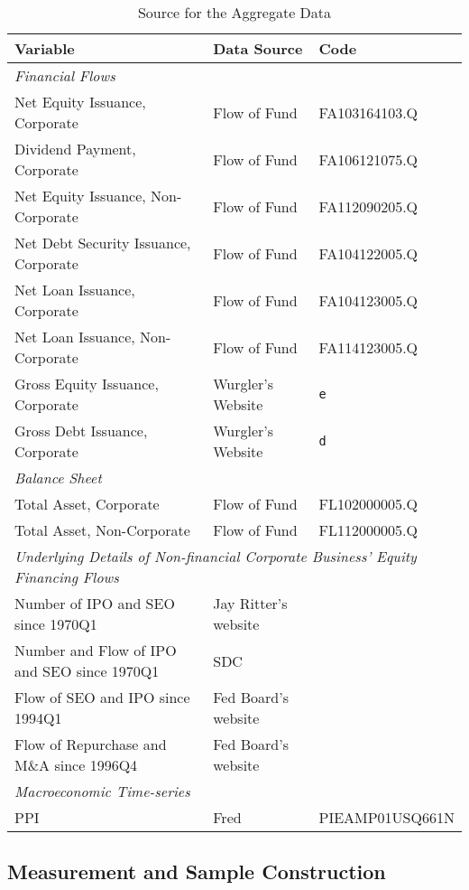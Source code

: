 \documentclass[11pt]{article}
\begin{document}
\begin{table}[htbp]
	\centering
	\caption{Source for the Aggregate Data}
	\begin{tabular}{lll}
		\toprule
		Variable & Data Source & Code \\
		\midrule
		\multicolumn{3}{l}{\textit{Financial Flows}} \\
		Net Equity Issuance, Corporate & Flow of Fund & FA103164103.Q \\
		Dividend Payment, Corporate & Flow of Fund & FA106121075.Q \\
		Net Equity Issuance, Non-Corporate & Flow of Fund & FA112090205.Q \\
		Net Debt Security Issuance, Corporate & Flow of Fund & FA104122005.Q \\
		Net Loan Issuance, Corporate & Flow of Fund & FA104123005.Q \\
		Net Loan Issuance, Non-Corporate & Flow of Fund & FA114123005.Q \\
		Gross Equity Issuance, Corporate & Wurgler's Website & \texttt{e} \\
		Gross Debt Issuance, Corporate & Wurgler's Website & \texttt{d} \\
		\midrule
		\multicolumn{3}{l}{\textit{Balance Sheet}} \\
		Total Asset, Corporate & Flow of Fund & FL102000005.Q \\
		Total Asset, Non-Corporate & Flow of Fund & FL112000005.Q \\
		\midrule
		\multicolumn{3}{l}{\textit{Underlying Details of Non-financial Corporate Business' Equity Financing Flows}} \\
		Number of IPO and SEO since 1970Q1 			& Jay Ritter's website 	&  \\
		Number and Flow of IPO and SEO since 1970Q1& SDC 	&  \\
		Flow of SEO and IPO since 1994Q1 			& Fed Board's website 	&  \\
		Flow of Repurchase and M\&A since 1996Q4 	& Fed Board's website 	&  \\
		\midrule
		\multicolumn{3}{l}{\textit{Macroeconomic Time-series}} \\
		PPI   & Fred  & PIEAMP01USQ661N \\
		\bottomrule
	\end{tabular}%
	\label{Tab: DataSource}%
	
\end{table}%

\subsection{Measurement and Sample Construction}
\end{document}
